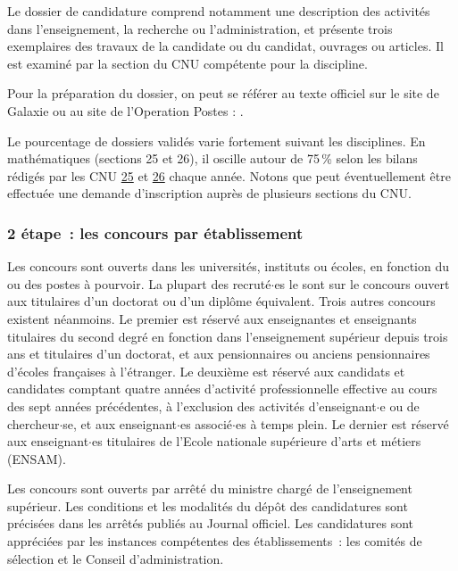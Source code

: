 Le dossier de candidature comprend notamment une
description des activit\'es dans l'enseignement, la recherche ou
l'administration, et pr\'esente trois exemplaires des travaux de la candidate ou du candidat,
ouvrages ou articles. Il est examin\'e par la section du CNU
comp\'etente pour la discipline.

Pour la pr\'eparation du dossier, on peut se r\'ef\'erer au texte officiel sur le site de Galaxie
ou au site de l'Operation Postes : .

Le pourcentage de dossiers valid\'es
varie fortement suivant les disciplines. En math\'ematiques
(sections 25 et 26), il oscille autour de 75\,\% selon les bilans r\'edig\'es par les CNU 
\href{http://cnu25.emath.fr/}{25} et \href{http://cnu26.emath.fr/}{26} chaque ann\'ee. Notons que peut
\'eventuellement \^etre effectu\'ee
une demande d'inscription aupr\`es de plusieurs sections du CNU.

\subsubsection*{2\ieme{} \'etape~: les concours par \'etablissement}

Les concours sont ouverts dans les universit\'es, instituts ou
\'ecoles, en fonction du ou des postes \`a pourvoir. La plupart des
recrut\'e$\cdot$es le sont sur le concours ouvert aux titulaires d'un
doctorat ou d'un dipl\^ome \'equivalent. Trois autres concours
existent n\'eanmoins. Le premier est r\'eserv\'e aux enseignantes et enseignants
titulaires du second degr\'e en fonction dans l'enseignement
sup\'erieur depuis trois ans et titulaires d'un doctorat, et aux
pensionnaires ou anciens pensionnaires d'\'ecoles fran\c{c}aises \`a
l'\'etranger. Le deuxi\`eme est r\'eserv\'e aux candidats et candidates comptant
quatre ann\'ees d'activit\'e professionnelle effective au cours des
sept ann\'ees pr\'ec\'edentes, \`a l'exclusion des activit\'es
d'enseignant$\cdot$e ou de chercheur$\cdot$se, et aux enseignant$\cdot$es associ\'e$\cdot$es \`a
temps plein.
Le dernier est r\'eserv\'e aux enseignant$\cdot$es titulaires de l'Ecole nationale sup\'erieure d'arts et m\'etiers (ENSAM).

Les concours sont ouverts par arr\^et\'e du ministre charg\'e de
l'enseignement sup\'erieur. Les conditions et les modalit\'es du
d\'ep\^ot des candidatures sont pr\'ecis\'ees dans les arr\^et\'es
publi\'es au Journal officiel. Les candidatures sont
appr\'eci\'ees par les instances comp\'etentes des
\'etablissements~:
les comit\'es de s\'election et le Conseil d'administration.

